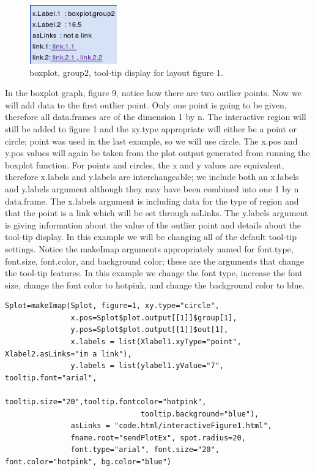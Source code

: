 \documentclass[]{article}
\begin{document}
 
\begin{center}
\begin{figure}
\includegraphics[width=1.5in, height=1in]{tip1}
\caption{boxplot, group2, tool-tip display for layout figure 1.}
\end{figure}
\end{center}


In the boxplot graph, figure 9, notice how there are two outlier points. Now we will add data to the first outlier point. Only one point is going to be given, therefore all data.frames are of the dimension 1 by n. The interactive region will still be added to figure 1 and the xy.type appropriate will either be a point or circle; point was used in the last example, so we will use circle. The x.pos and y.pos values will again be taken from the plot output generated from running the boxplot function. For points and circles, the x and y values are equivalent, therefore x.labels and y.labels are interchangeable; we include both an x.labels and y.labels argument although they may have been combined into one 1 by n data.frame. The x.labels argument is including data for the type of region and that the point is a link which will be set through asLinks. The y.labels argument is giving information about the value of the outlier point and details about the tool-tip display. In this example we will be changing all of the default tool-tip settings. Notice the makeImap arguments appropriately named for font.type, font.size, font.color, and background color; these are the arguments that change the tool-tip features. In this example we change the font type, increase the font size, change the font color to hotpink, and change the background color to blue.    



\begin{verbatim}
Splot=makeImap(Splot, figure=1, xy.type="circle", 
               x.pos=Splot$plot.output[[1]]$group[1], 
               y.pos=Splot$plot.output[[1]]$out[1],
               x.labels = list(Xlabel1.xyType="point", Xlabel2.asLinks="im a link"),
               y.labels = list(ylabel1.yValue="7", tooltip.font="arial",
                               tooltip.size="20",tooltip.fontcolor="hotpink",
                               tooltip.background="blue"),
               asLinks = "code.html/interactiveFigure1.html", 
               fname.root="sendPlotEx", spot.radius=20,
               font.type="arial", font.size="20", font.color="hotpink", bg.color="blue")
\end{verbatim}
\end{document}
